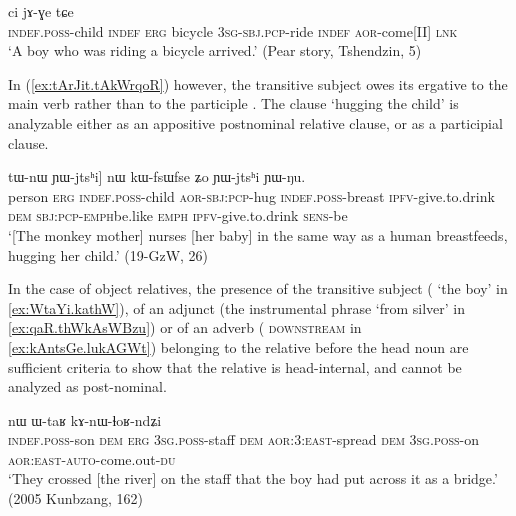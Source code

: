 \begin{exe}
\ex  \label{ex:WkWnWmbrApW}
 ci jɤ-ɣe tɕe \\
 \textsc{indef}.\textsc{poss}-child \textsc{indef} \textsc{erg} bicycle \textsc{3sg}-\textsc{sbj}.\textsc{pcp}-ride \textsc{indef} \textsc{aor}-come[II] \textsc{lnk} \\
\glt `A boy who was riding a bicycle arrived.' (Pear story, Tshendzin, 5)
\end{exe}

In (\ref{ex:tArJit.tAkWrqoR}) however, the transitive subject  owes its ergative to the main verb  rather than to the participle . The clause  `hugging the child' is analyzable either as an appositive postnominal relative clause, or as a participial clause.


\begin{exe}
\ex  \label{ex:tArJit.tAkWrqoR}
\gll  [tɯrme kɯ [tɤ-rɟit tɤ-kɯ-rqoʁ] tɯ-nɯ ɲɯ-jtsʰi] nɯ kɯ-fsɯ\redp{}fse ʑo ɲɯ-jtsʰi ɲɯ-ŋu.\\
person \textsc{erg} \textsc{indef}.\textsc{poss}-child \textsc{aor}-\textsc{sbj}:\textsc{pcp}-hug \textsc{indef}.\textsc{poss}-breast \textsc{ipfv}-give.to.drink \textsc{dem} \textsc{sbj}:\textsc{pcp}-\textsc{emph}\redp{}be.like \textsc{emph} \textsc{ipfv}-give.to.drink \textsc{sens}-be \\
\glt `[The monkey mother] nurses [her baby] in the same way as a human breastfeeds, hugging her child.' (19-GzW, 26)
\end{exe}

In the case of object relatives,  the presence of the transitive subject ( `the boy' in \ref{ex:WtaYi.kathW}), of an adjunct (the instrumental phrase  `from silver' in \ref{ex:qaR.thWkAsWBzu}) or of an adverb ( \textsc{downstream} in \ref{ex:kAntsGe.lukAGWt}) belonging to the relative before the head noun are sufficient criteria to show that the relative is head-internal, and cannot be analyzed as post-nominal.
 
\begin{exe}
\ex \label{ex:WtaYi.kathW}
 nɯ ɯ-taʁ kɤ-nɯ-ɬoʁ-ndʑi   \\
\textsc{indef}.\textsc{poss}-son \textsc{dem} \textsc{erg} \textsc{3sg}.\textsc{poss}-staff \textsc{dem} \textsc{aor}:3\flobv{}:\textsc{east}-spread \textsc{dem} \textsc{3sg}.\textsc{poss}-on \textsc{aor}:\textsc{east}-\textsc{auto}-come.out-\textsc{du} \\
\glt `They crossed [the river] on the staff that the boy had put across it as a bridge.' (2005 Kunbzang, 162)
 \end{exe}  
 
